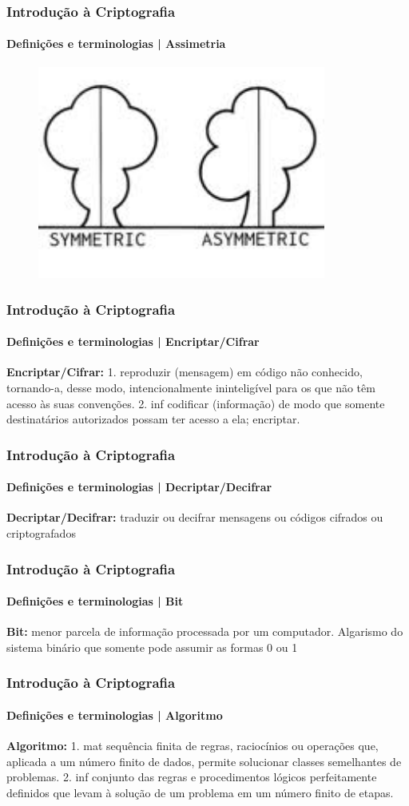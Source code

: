 \documentclass[compress]{beamer}
\begin{document}
\begin{frame}
\frametitle{Introdução à Criptografia}
\framesubtitle{Definições e terminologias | Assimetria}
\begin{figure}[h]
	\includegraphics[height=7cm]{pics/assimetria}
\end{figure}
\end{frame}


\begin{frame}
\frametitle{Introdução à Criptografia}
\framesubtitle{Definições e terminologias | Encriptar/Cifrar}
\justifying
	\textbf{Encriptar/Cifrar:} 1. reproduzir (mensagem) em código não conhecido, tornando-a, desse modo, intencionalmente ininteligível para os que não têm acesso às suas convenções. 2. inf codificar (informação) de modo que somente destinatários autorizados possam ter acesso a ela; encriptar.
\end{frame}

\begin{frame}
\frametitle{Introdução à Criptografia}
\framesubtitle{Definições e terminologias | Decriptar/Decifrar}
\justifying
	\textbf{Decriptar/Decifrar:} traduzir ou decifrar mensagens ou códigos cifrados ou criptografados
\end{frame}

\begin{frame}
\frametitle{Introdução à Criptografia}
\framesubtitle{Definições e terminologias | Bit}
\justifying
	\textbf{Bit:} menor parcela de informação processada por um computador. Algarismo do sistema binário que somente pode assumir as formas 0 ou 1
\end{frame}

\begin{frame}
\frametitle{Introdução à Criptografia}
\framesubtitle{Definições e terminologias | Algoritmo}
\justifying
	\textbf{Algoritmo:} 1. mat sequência finita de regras, raciocínios ou operações que, aplicada a um número finito de dados, permite solucionar classes semelhantes de problemas. 2. inf conjunto das regras e procedimentos lógicos perfeitamente definidos que levam à solução de um problema em um número finito de etapas.
\end{frame}
\end{document}
